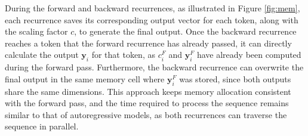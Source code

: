 During the forward and backward recurrences, as illustrated in Figure \ref{fig:mem}, each recurrence saves its corresponding output vector for each token, along with the scaling factor \(c\), to generate the final output. Once the backward recurrence reaches a token that the forward recurrence has already passed, it can directly calculate the output \(\mathbf{y}_i\) for that token, as \(c^F_i\) and \(\mathbf{y}^F_i\) have already been computed during the forward pass. Furthermore, the backward recurrence can overwrite the final output in the same memory cell where \(\mathbf{y}^F_i\) was stored, since both outputs share the same dimensions. This approach keeps memory allocation consistent with the forward pass, and the time required to process the sequence remains similar to that of autoregressive models, as both recurrences can traverse the sequence in parallel.


